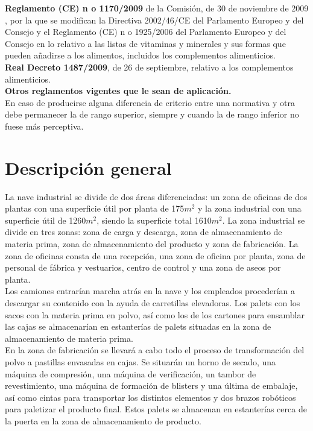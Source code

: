 {\bfseries Reglamento (CE) n o 1170/2009} de la Comisión, de 30 de noviembre de 2009 , por la que se modifican la Directiva 2002/46/CE del Parlamento Europeo y del Consejo y el Reglamento (CE) n o 1925/2006 del Parlamento Europeo y del Consejo en lo relativo a las listas de vitaminas y minerales y sus formas que pueden añadirse a los alimentos, incluidos los complementos alimenticios.\\

{\bfseries Real Decreto 1487/2009}, de 26 de septiembre, relativo a los complementos
alimenticios.\\

{\bfseries Otros reglamentos vigentes que le sean de aplicación.}\\

En caso de producirse alguna diferencia de criterio entre una normativa y otra debe permanecer la de rango superior, siempre y cuando la de rango inferior no fuese más perceptiva.

\section{Descripción general}

La nave industrial se divide de dos áreas diferenciadas: un zona de oficinas de dos plantas con una superficie útil por planta de 175$m^2$ y la zona industrial con una superficie útil de 1260$m^2$, siendo la superficie total 1610${m^2}$. La zona industrial se divide en tres zonas: zona de carga y descarga, zona de almacenamiento de materia prima, zona de almacenamiento del producto y zona de fabricación. La zona de oficinas consta de una recepción, una zona de oficina por planta, zona de personal de fábrica y vestuarios, centro de control y una zona de aseos por planta.
\\

Los camiones entrarían marcha atrás en la nave y los empleados procederían a descargar su contenido con la ayuda de carretillas elevadoras. Los palets con los sacos con la materia prima en polvo, así como los de los cartones para ensamblar las cajas se almacenarían en estanterías de palets situadas en la zona de almacenamiento de materia prima. 
\\

En la zona de fabricación se llevará a cabo todo el proceso de transformación del polvo a pastillas envasadas en cajas. Se situarán un horno de secado, una máquina de compresión, una máquina de verificación, un tambor de revestimiento, una máquina de formación de blisters y una última de embalaje, así como cintas para transportar los distintos elementos y dos brazos robóticos para paletizar el producto final. Estos palets se almacenan en estanterías cerca de la puerta en la zona de almacenamiento de producto.\\

